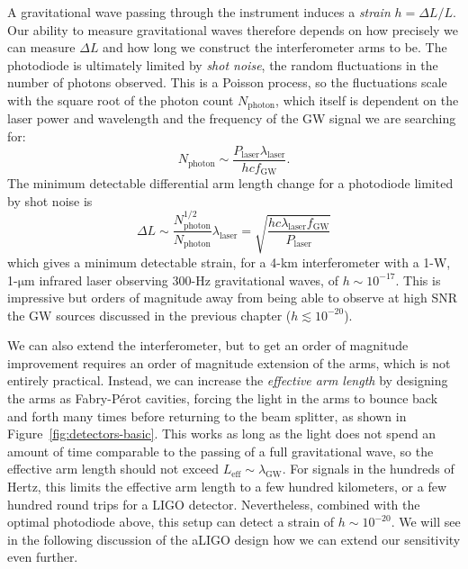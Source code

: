 A gravitational wave passing through the instrument induces a \textit{strain} $h = \Delta L / L$.
Our ability to measure gravitational waves therefore depends on how precisely we can measure $\Delta L$ and how long we construct the interferometer arms to be.
The photodiode is ultimately limited by \textit{shot noise}, the random fluctuations in the number of photons observed.
This is a Poisson process, so the fluctuations scale with the square root of the photon count $N_{\mathrm{photon}}$, which itself is dependent on the laser power and wavelength and the frequency of the GW signal we are searching for:
\begin{equation}
  N_{\mathrm{photon}} \sim \frac{P_{\mathrm{laser}} \lambda_{\mathrm{laser}}}{h c f_{\mathrm{GW}}}.
\end{equation}
The minimum detectable differential arm length change for a photodiode limited by shot noise is
\begin{equation}
  \Delta L \sim \frac{N_{\mathrm{photon}}^{1/2}}{N_{\mathrm{photon}}} \lambda_{\mathrm{laser}} = \sqrt{ \frac{h c \lambda_{\mathrm{laser}} f_{\mathrm{GW}}}{P_{\mathrm{laser}}} }
\end{equation}
which gives a minimum detectable strain, for a 4-km interferometer with a 1-W, 1-$\mathrm{\mu}$m infrared laser observing 300-Hz gravitational waves, of $h \sim 10^{-17}$.
This is impressive but orders of magnitude away from being able to observe at high \ac{SNR} the GW sources discussed in the previous chapter ($h \lesssim 10^{-20}$).

We can also extend the interferometer, but to get an order of magnitude improvement requires an order of magnitude extension of the arms, which is not entirely practical.
Instead, we can increase the \textit{effective arm length} by designing the arms as Fabry-P\'erot cavities, forcing the light in the arms to bounce back and forth many times before returning to the beam splitter, as shown in Figure~\ref{fig:detectors-basic}.
This works as long as the light does not spend an amount of time comparable to the passing of a full gravitational wave, so the effective arm length should not exceed $L_{\mathrm{eff}} \sim \lambda_{\mathrm{GW}}$.
For signals in the hundreds of Hertz, this limits the effective arm length to a few hundred kilometers, or a few hundred round trips for a LIGO detector.
Nevertheless, combined with the optimal photodiode above, this setup can detect a strain of $h \sim 10^{-20}$.
We will see in the following discussion of the \ac{aLIGO} design how we can extend our sensitivity even further.

